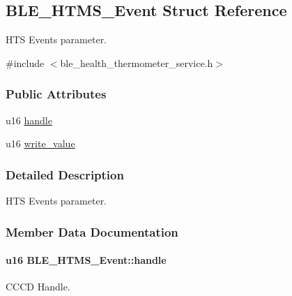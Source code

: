 \hypertarget{struct_b_l_e___h_t_m_s___event}{}\subsection{B\+L\+E\+\_\+\+H\+T\+M\+S\+\_\+\+Event Struct Reference}
\label{struct_b_l_e___h_t_m_s___event}


H\+TS Events parameter.  




{\ttfamily \#include $<$ble\+\_\+health\+\_\+thermometer\+\_\+service.\+h$>$}

\subsubsection*{Public Attributes}
\begin{DoxyCompactItemize}
\item 
u16 \hyperlink{struct_b_l_e___h_t_m_s___event_a083643d7b784c3272c75914ec376a190}{handle}
\item 
u16 \hyperlink{struct_b_l_e___h_t_m_s___event_ada3a64fa54a25ef665b62e46cad55a5c}{write\+\_\+value}
\end{DoxyCompactItemize}


\subsubsection{Detailed Description}
H\+TS Events parameter. 

\subsubsection{Member Data Documentation}
\paragraph[{\texorpdfstring{handle}{handle}}]{\setlength{\rightskip}{0pt plus 5cm}u16 B\+L\+E\+\_\+\+H\+T\+M\+S\+\_\+\+Event\+::handle}\hypertarget{struct_b_l_e___h_t_m_s___event_a083643d7b784c3272c75914ec376a190}{}\label{struct_b_l_e___h_t_m_s___event_a083643d7b784c3272c75914ec376a190}
C\+C\+CD Handle. 
